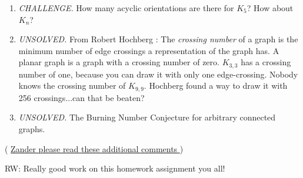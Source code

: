 \documentclass[11pt]{article}
\begin{document}
\begin{enumerate}[leftmargin=*]
\item \color{red} \textit{CHALLENGE. }\color{black} How many acyclic orientations are there for $K_5$? How about $K_n$?
\item \color{blue} \textit{UNSOLVED. }\color{black} From Robert Hochberg : The \textit{crossing number} of a graph is the minimum number of edge crossings a representation of the graph has. A planar graph is a graph with a crossing number of zero. $K_{3, 3}$ has a crossing number of one, because you can draw it with only one edge-crossing. Nobody knows the crossing number of $K_{9,9}$. Hochberg found a way to draw it with 256 crossings...can that be beaten? 
\item \color{blue} \textit{UNSOLVED. } \color{black} The Burning Number Conjecture for arbitrary connected graphs. 
\end{enumerate}

\color{blue}( \href{https://www.youtube.com/watch?v=dQw4w9WgXcQ}{Zander please read these additional comments })\color{black}

\color{blue} RW: Really good work on this homework assignment you all! \color{black}
\end{document}
